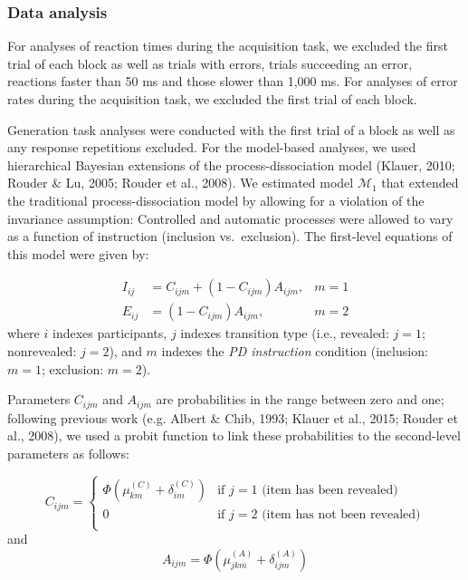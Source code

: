 \documentclass[man]{apa6}
\theoremstyle{definition}
\theoremstyle{definition}
\theoremstyle{definition}
\theoremstyle{remark}
\begin{document}
\subsubsection{Data analysis}\label{data-analysis-1}

For analyses of reaction times during the acquisition task, we excluded
the first trial of each block as well as trials with errors, trials
succeeding an error, reactions faster than 50 ms and those slower than
1,000 ms. For analyses of error rates during the acquisition task, we
excluded the first trial of each block.

Generation task analyses were conducted with the first trial of a block
as well as any response repetitions excluded. For the model-based
analyses, we used hierarchical Bayesian extensions of the
process-dissociation model (Klauer, 2010; Rouder \& Lu, 2005; Rouder et
al., 2008). We estimated model \(\mathcal{M}_1\) that extended the
traditional process-dissociation model by allowing for a violation of
the invariance assumption: Controlled and automatic processes were
allowed to vary as a function of instruction (inclusion vs.~exclusion).
The first-level equations of this model were given by:

\[
\begin{aligned}
  I_{ij} & =  C_{ijm} + (1-C_{ijm}) A_{ijm},& m = 1\\
  E_{ij} & =  (1-C_{ijm}) A_{ijm},& m = 2
\end{aligned}
\] where \(i\) indexes participants, \(j\) indexes transition type
(i.e., revealed: \(j = 1\); nonrevealed: \(j = 2\)), and \(m\) indexes
the \emph{PD instruction} condition (inclusion: \(m=1\); exclusion:
\(m=2\)).

Parameters \(C_{ijm}\) and \(A_{ijm}\) are probabilities in the range
between zero and one; following previous work (e.g. Albert \& Chib,
1993; Klauer et al., 2015; Rouder et al., 2008), we used a probit
function to link these probabilities to the second-level parameters as
follows:

\[
  C_{ijm} = \begin{cases}
    \Phi(\mu_{km}^{(C)} + \delta_{im}^{(C)}) & \text{if } j=1 \text{ (item has been revealed)}\\
                                            0 & \text{if } j=2 \text{ (item has not been revealed)}\\
    \end{cases}
\] and \[
  A_{ijm} = \Phi(\mu_{jkm}^{(A)} + \delta_{ijm}^{(A)})
\]
\end{document}
